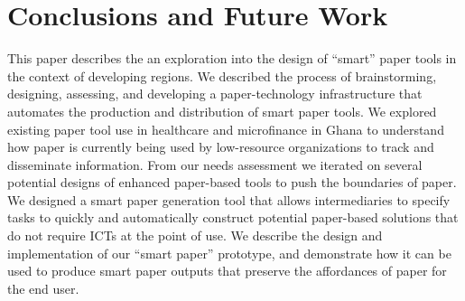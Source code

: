 \documentclass{sig-alternate}
\begin{document}





\section{Conclusions and Future Work}
\label{sec:future-work}

This paper describes the an exploration into the design of ``smart'' paper tools in the context of developing regions. We described the process of brainstorming, designing, assessing, and developing a paper-technology infrastructure that automates the production and distribution of smart paper tools. We explored existing paper tool use in healthcare and microfinance in Ghana to understand how paper is currently being used by low-resource organizations to track and disseminate information. From our needs assessment we iterated on several potential designs of enhanced paper-based tools to push the boundaries of paper. We designed a smart paper generation tool that allows intermediaries to specify tasks to quickly and automatically construct potential paper-based solutions that do not require ICTs at the point of use. We describe the design and implementation of our ``smart paper'' prototype, \nifty and demonstrate how it can be used to produce smart paper outputs that preserve the affordances of paper for the end user.
\end{document}
